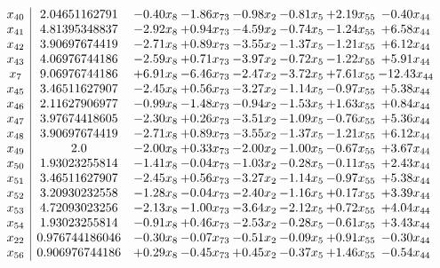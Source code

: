 \documentclass[8pt]{article}
\begin{document}
\[\begin{array}{c| c c@{\hskip 2pt} c@{\hskip 2pt} c@{\hskip 2pt} c@{\hskip 2pt} c@{\hskip 2pt} c@{\hskip 2pt} }
 x_{40}   &  2.04651162791 & -0.40 x_{8} & -1.86 x_{73} & -0.98 x_{2} & -0.81 x_{5} & +  2.19 x_{55} & -0.40 x_{44}\\
 x_{41}   &  4.81395348837 & -2.92 x_{8} & +  0.94 x_{73} & -4.59 x_{2} & -0.74 x_{5} & -1.24 x_{55} & +  6.58 x_{44}\\
 x_{42}   &  3.90697674419 & -2.71 x_{8} & +  0.89 x_{73} & -3.55 x_{2} & -1.37 x_{5} & -1.21 x_{55} & +  6.12 x_{44}\\
 x_{43}   &  4.06976744186 & -2.59 x_{8} & +  0.71 x_{73} & -3.97 x_{2} & -0.72 x_{5} & -1.22 x_{55} & +  5.91 x_{44}\\
 x_{7}   &  9.06976744186 & +  6.91 x_{8} & -6.46 x_{73} & -2.47 x_{2} & -3.72 x_{5} & +  7.61 x_{55} & -12.43 x_{44}\\
 x_{45}   &  3.46511627907 & -2.45 x_{8} & +  0.56 x_{73} & -3.27 x_{2} & -1.14 x_{5} & -0.97 x_{55} & +  5.38 x_{44}\\
 x_{46}   &  2.11627906977 & -0.99 x_{8} & -1.48 x_{73} & -0.94 x_{2} & -1.53 x_{5} & +  1.63 x_{55} & +  0.84 x_{44}\\
 x_{47}   &  3.97674418605 & -2.30 x_{8} & +  0.26 x_{73} & -3.51 x_{2} & -1.09 x_{5} & -0.76 x_{55} & +  5.36 x_{44}\\
 x_{48}   &  3.90697674419 & -2.71 x_{8} & +  0.89 x_{73} & -3.55 x_{2} & -1.37 x_{5} & -1.21 x_{55} & +  6.12 x_{44}\\
 x_{49}   &  2.0 & -2.00 x_{8} & +  0.33 x_{73} & -2.00 x_{2} & -1.00 x_{5} & -0.67 x_{55} & +  3.67 x_{44}\\
 x_{50}   &  1.93023255814 & -1.41 x_{8} & -0.04 x_{73} & -1.03 x_{2} & -0.28 x_{5} & -0.11 x_{55} & +  2.43 x_{44}\\
 x_{51}   &  3.46511627907 & -2.45 x_{8} & +  0.56 x_{73} & -3.27 x_{2} & -1.14 x_{5} & -0.97 x_{55} & +  5.38 x_{44}\\
 x_{52}   &  3.20930232558 & -1.28 x_{8} & -0.04 x_{73} & -2.40 x_{2} & -1.16 x_{5} & +  0.17 x_{55} & +  3.39 x_{44}\\
 x_{53}   &  4.72093023256 & -2.13 x_{8} & -1.00 x_{73} & -3.64 x_{2} & -2.12 x_{5} & +  0.72 x_{55} & +  4.04 x_{44}\\
 x_{54}   &  1.93023255814 & -0.91 x_{8} & +  0.46 x_{73} & -2.53 x_{2} & -0.28 x_{5} & -0.61 x_{55} & +  3.43 x_{44}\\
 x_{22}   &  0.976744186046 & -0.30 x_{8} & -0.07 x_{73} & -0.51 x_{2} & -0.09 x_{5} & +  0.91 x_{55} & -0.30 x_{44}\\
 x_{56}   &  0.906976744186 & +  0.29 x_{8} & -0.45 x_{73} & +  0.45 x_{2} & -0.37 x_{5} & +  1.46 x_{55} & -0.54 x_{44}\\

\end{array}\]
\end{document}
